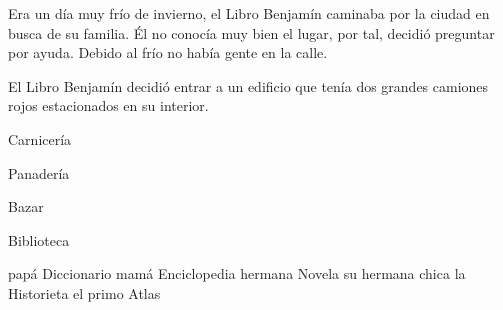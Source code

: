 Era un día muy frío de invierno, el Libro Benjamín caminaba por la
ciudad en busca de su familia. Él no conocía muy bien el lugar, por
tal, decidió preguntar por ayuda. Debido al frío no había gente en la
calle. 

El Libro Benjamín decidió entrar a un edificio que tenía dos grandes
camiones rojos estacionados en su interior. 

Carnicería

Panadería

Bazar

Biblioteca

papá Diccionario 
mamá Enciclopedia
hermana Novela
su hermana chica la Historieta
el primo Atlas
